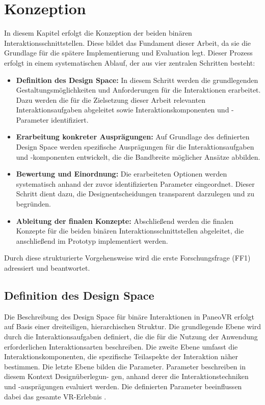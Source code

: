 \chapter{Konzeption}
\label{chap:Konzept}


In diesem Kapitel erfolgt die Konzeption der beiden binären Interaktionsschnittstellen. Diese bildet das Fundament dieser Arbeit, da sie die Grundlage für die spätere Implementierung und Evaluation legt. Dieser Prozess erfolgt in einem systematischen Ablauf, der aus vier zentralen Schritten besteht:

\begin{itemize}
    \item \textbf{Definition des Design Space:}
    In diesem Schritt werden die grundlegenden Gestaltungsmöglichkeiten und Anforderungen für die Interaktionen erarbeitet. Dazu werden die für die Zielsetzung dieser Arbeit relevanten Interaktionsaufgaben abgeleitet sowie Interaktionskomponenten und -Parameter identifiziert.
    \item \textbf{Erarbeitung konkreter Ausprägungen:}
    Auf Grundlage des definierten Design Space werden spezifische Ausprägungen für die Interaktionsaufgaben und -komponenten entwickelt, die die Bandbreite möglicher Ansätze abbilden.
    \item \textbf{Bewertung und Einordnung:}
    Die erarbeiteten Optionen werden systematisch anhand der zuvor identifizierten Parameter eingeordnet. Dieser Schritt dient dazu, die Designentscheidungen transparent darzulegen und zu begründen.
    \item \textbf{Ableitung der finalen Konzepte:}
    Abschließend werden die finalen Konzepte für die beiden binären Interaktionsschnittstellen abgeleitet, die anschließend im Prototyp implementiert werden.
\end{itemize}
 
Durch diese strukturierte Vorgehensweise wird die erste Forschungsfrage (FF1) adressiert und beantwortet.   

\section{Definition des Design Space}

Die Beschreibung des Design Space für binäre Interaktionen in PaneoVR erfolgt auf Basis einer dreiteiligen, hierarchischen Struktur. Die grundlegende Ebene wird durch die Interaktionsaufgaben definiert, die die für die Nutzung der Anwendung erforderlichen Interaktionsarten beschreiben. Die zweite Ebene umfasst die Interaktionskomponenten, die spezifische Teilaspekte der Interaktion näher bestimmen. Die letzte Ebene bilden die Parameter. Parameter beschreiben in diesem Kontext Designüberlegun-
gen, anhand derer die Interaktionstechniken und -ausprägungen evaluiert werden. Die definierten Parameter beeinflussen dabei das gesamte VR-Erlebnis \citep{10.1145/3441852.3471230}.

